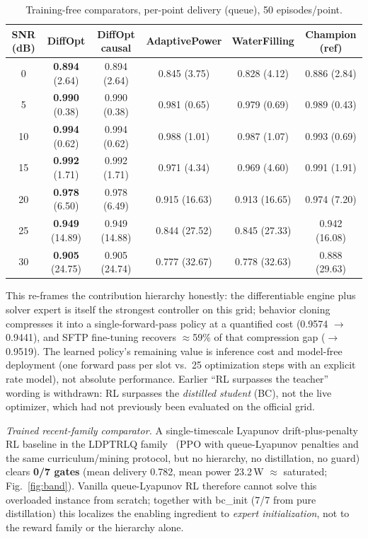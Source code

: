 \documentclass[journal]{IEEEtran}
\begin{document}
\begin{table}[t]
\centering
\small
\caption{Training-free comparators, per-point delivery (queue), 50 episodes/point.}
\label{tab:free}
\begin{tabular}{c|c|c|c|c|c}
\toprule
SNR (dB) & DiffOpt & DiffOpt causal & AdaptivePower & WaterFilling & Champion (ref) \\
\midrule
0  & \textbf{0.894} (2.64)  & 0.894 (2.64)  & 0.845 (3.75)  & 0.828 (4.12)  & 0.886 (2.84) \\
5  & \textbf{0.990} (0.38)  & 0.990 (0.38)  & 0.981 (0.65)  & 0.979 (0.69)  & 0.989 (0.43) \\
10 & \textbf{0.994} (0.62)  & 0.994 (0.62)  & 0.988 (1.01)  & 0.987 (1.07)  & 0.993 (0.69) \\
15 & \textbf{0.992} (1.71)  & 0.992 (1.71)  & 0.971 (4.34)  & 0.969 (4.60)  & 0.991 (1.91) \\
20 & \textbf{0.978} (6.50)  & 0.978 (6.49)  & 0.915 (16.63) & 0.913 (16.65) & 0.974 (7.20) \\
25 & \textbf{0.949} (14.89) & 0.949 (14.88) & 0.844 (27.52) & 0.845 (27.33) & 0.942 (16.08) \\
30 & \textbf{0.905} (24.75) & 0.905 (24.74) & 0.777 (32.67) & 0.778 (32.63) & 0.888 (29.63) \\
\bottomrule
\end{tabular}
\end{table}

This re-frames the contribution hierarchy honestly: the differentiable engine plus
solver expert is itself the strongest controller on this grid; behavior cloning
compresses it into a single-forward-pass policy at a quantified cost
(0.9574 $\to$ 0.9441), and SFTP fine-tuning recovers $\approx$59\% of that
compression gap ($\to$ 0.9519). The learned policy's remaining value is inference
cost and model-free deployment (one forward pass per slot vs.\ 25 optimization
steps with an explicit rate model), not absolute performance. Earlier ``RL
surpasses the teacher'' wording is withdrawn: RL surpasses the \emph{distilled
student} (BC), not the live optimizer, which had not previously been evaluated on
the official grid.

\emph{Trained recent-family comparator.} A single-timescale Lyapunov
drift-plus-penalty RL baseline in the LDPTRLQ family~\cite{zhu2025lyapguid} (PPO
with queue-Lyapunov penalties and the same curriculum/mining protocol, but no
hierarchy, no distillation, no guard) clears \textbf{0/7 gates} (mean delivery
0.782, mean power 23.2\,W $\approx$ saturated; Fig.~\ref{fig:band}). Vanilla
queue-Lyapunov RL therefore cannot solve this overloaded instance from scratch;
together with bc\_init (7/7 from pure distillation) this localizes the enabling
ingredient to \emph{expert initialization}, not to the reward family or the
hierarchy alone.
\end{document}
